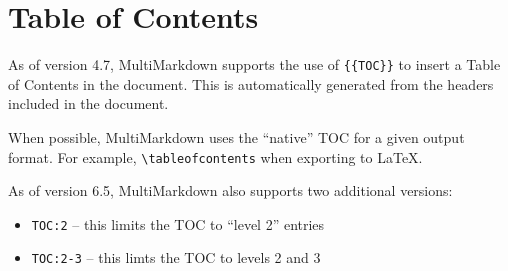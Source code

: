 
\def\mytitle{Table of Contents}
\def\myauthor{Fletcher T. Penney}
\def\revised{2018-11-29}




\tableofcontents

\section{Table of Contents}
\label{tableofcontents}

As of version 4.7, MultiMarkdown supports the use of \texttt{\{\{TOC\}\}} to insert a Table of Contents in the document. This is automatically generated from the headers included in the document.

When possible, MultiMarkdown uses the ``native'' TOC for a given output format. For example, \texttt{\textbackslash{}tableofcontents} when exporting to LaTeX.

As of version 6.5, MultiMarkdown also supports two additional versions:

\begin{itemize}
\item \texttt{{{TOC:2}}} -- this limits the TOC to ``level 2'' entries

\item \texttt{{{TOC:2-3}}} -- this limts the TOC to levels 2 and 3

\end{itemize}




